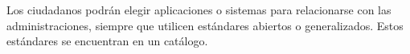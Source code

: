             Los ciudadanos podrán elegir aplicaciones o sistemas para relacionarse con las administraciones, siempre que utilicen estándares abiertos o generalizados. Estos estándares se encuentran en un catálogo.











